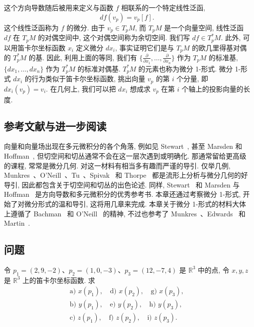 这个方向导数随后被用来定义与函数 $f$ 相联系的一个特定线性泛函, 
\[
df(v_p)=v_p[f].
\]
这个线性泛函称为 $f$ 的微分. 由于 $v_p\in T_pM$, 而 $T_pM$ 是一个向量空间, 线性泛函 $df$ 在 $T_pM$ 的对偶空间中, 这个对偶空间称为余切空间. 我们写 $df\in T_p^*M$. 此外, 可以用笛卡尔坐标函数 $x_i$ 定义微分 $dx_i$, 事实证明它们是与 $T_pM$ 的欧几里得基对偶的 $T_p^*M$ 的基. 因此, 利用上面的等同, 我们有 $\{\frac{\partial}{\partial x_1},\ldots,\frac{\partial}{\partial x_n}\}$ 作为 $T_pM$ 的标准基, $\{dx_1,\ldots,dx_n\}$ 作为 $T_p^*M$ 的标准对偶基. $T_p^*M$ 的元素也称为微分 1-形式. 微分 1-形式 $dx_i$ 的行为类似于笛卡尔坐标函数, 挑出向量 $v_p$ 的第 $i$ 个分量, 即 $dx_i(v_p)=v_i$. 在几何上, 我们可以把 $dx_i$ 想成求 $v_p$ 在第 $i$ 个轴上的投影向量的长度.

\subsection{参考文献与进一步阅读}

向量和向量场出现在多元微积分的各个角落, 例如见 Stewart~\cite{ref43}, 甚至 Marsden 和 Hoffman~\cite{ref31}, 但切空间和切丛通常不会在这一层次遇到或明确化. 那通常留给更高级的课程, 常常是微分几何. 对这一材料有相当多有趣而严谨的导引. 仅举几例, Munkres~\cite{ref35}、O'Neill~\cite{ref36}、Tu~\cite{ref46}、Spivak~\cite{ref41} 和 Thorpe~\cite{ref45} 都是流形上分析与微分几何的好导引, 因此都包含关于切空间和切丛的出色论述. 同样, Stewart~\cite{ref43} 和 Marsden 与 Hoffman~\cite{ref31} 是方向导数和多元微积分的优秀参考书. 本章还通过考察微分 1-形式, 开始了对微分形式的温和导引, 这将用几章来完成. 本章关于微分 1-形式的材料大体上遵循了 Bachman~\cite{ref04} 和 O'Neill~\cite{ref36} 的精神, 不过也参考了 Munkres~\cite{ref35}、Edwards~\cite{ref18} 和 Martin~\cite{ref33}.

\subsection{问题}

\begin{question}\label{q:2-18}
令 $p_1=(2,9,-2)$、$p_2=(1,0,-3)$、$p_3=(12,-7,4)$ 是 $\mathbb{R}^3$ 中的点, 令 $x,y,z$ 是 $\mathbb{R}^3$ 上的笛卡尔坐标函数. 求
\begin{gather*}
\text{a) }x(p_1),\quad \text{d) }x(p_2),\quad \text{g) }x(p_3),\\
\text{b) }y(p_1),\quad \text{e) }y(p_2),\quad \text{h) }y(p_3),\\
\text{c) }z(p_1),\quad \text{f) }z(p_2),\quad \text{i) }z(p_3).
\end{gather*}
\end{question}

